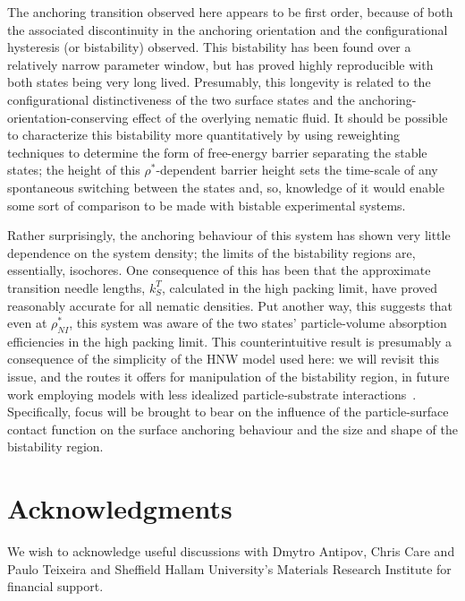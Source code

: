 \documentclass[aps,10pt,twocolumn]{revtex4}
\begin{document}
The anchoring transition observed here appears to be first order, because of both the associated discontinuity in
the anchoring orientation and the configurational hysteresis (or bistability) observed. This bistability has been
found over a relatively narrow parameter window, but has proved highly reproducible with both states being very
long lived. Presumably, this longevity is related to the configurational distinctiveness of the two surface states
and the anchoring-orientation-conserving effect of the overlying nematic fluid. It should be possible to
characterize this bistability more quantitatively by using reweighting techniques to determine the form of
free-energy barrier separating the stable states; the height of this $\rho^*$-dependent barrier height sets the
time-scale of any spontaneous switching between the states and, so, knowledge of it would enable some sort of
comparison to be made with bistable experimental systems.

Rather surprisingly, the anchoring behaviour of this system has shown very little dependence on the system
density; the limits of the bistability regions are, essentially, isochores. One consequence of this has been that
the approximate transition needle lengths, $k_S^T$, calculated in the high packing limit, have proved reasonably
accurate for all nematic densities. Put another way, this suggests that even at $\rho_{NI}^*$, this system was
aware of the two states' particle-volume absorption efficiencies in the high packing limit. This counterintuitive
result is presumably a consequence of the simplicity of the HNW model used here: we will revisit this issue, and
the routes it offers for manipulation of the bistability region, in future work employing models with less
idealized particle-substrate interactions~\cite{BarmesCleaver03b}. Specifically, focus will be brought to bear on
the influence of the particle-surface contact function on the surface anchoring behaviour and the size and shape
of the bistability region.



\section*{Acknowledgments}

We wish to acknowledge useful discussions with Dmytro Antipov, Chris Care and Paulo Teixeira and Sheffield Hallam
University's Materials Research Institute for financial support.
\end{document}
